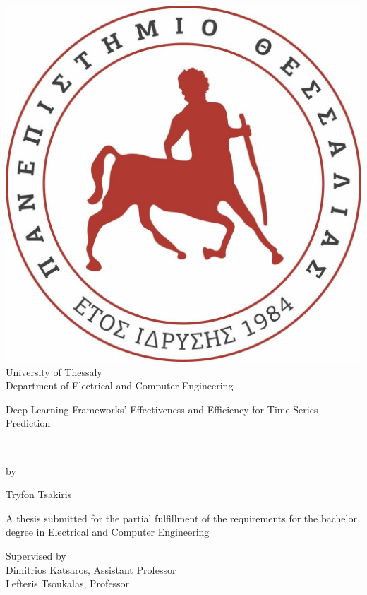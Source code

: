 \documentclass[a4paper, 12pt]{article}
\numberwithin{equation}{section}
\numberwithin{figure}{section}
\numberwithin{table}{section}
\begin{document}
	
	
	\begin{titlepage}
		
		\centering
		\includegraphics[scale=0.12, keepaspectratio]{uth.jpg}\\
		\vspace*{1cm}
		{\Large University of Thessaly}\\
		\vspace*{0.5cm}
		{\Large Department of Electrical and Computer Engineering}\\
		\vspace*{1cm}
		{\Large\bfseries{Deep Learning Frameworks' Effectiveness and Efficiency for Time Series Prediction\par}}
		\noindent\makebox[3cm]{\hrulefill} \hfill\makebox[3cm]{\hrulefill}\\
		\vspace*{0.5cm}
		{\large by\par}
		\vspace{0.3cm}
		{\large Tryfon Tsakiris\par}
		\vspace*{2cm}
		{\normalsize A thesis submitted for the partial fulfillment of the requirements for the bachelor degree in Electrical and Computer Engineering\par}
		\vspace*{2cm}
		{\large Supervised by\\[0.3cm] Dimitrios Katsaros, Assistant Professor\\ Lefteris Tsoukalas, Professor\par}
	\end{titlepage}
	
\end{document}
